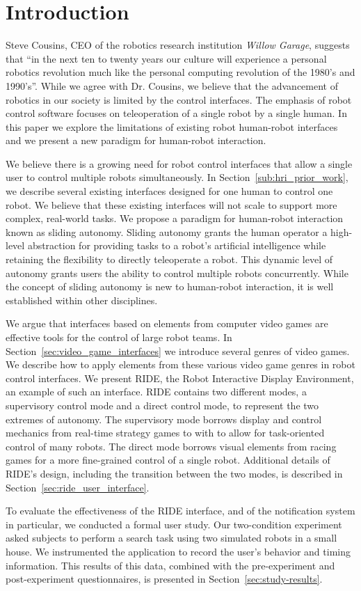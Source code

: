 \chapter{Introduction}
Steve Cousins, CEO of the robotics research institution \emph{Willow Garage}, suggests that ``in the next ten to twenty years our culture will experience a personal robotics revolution much like the personal computing revolution of the 1980's and 1990's''. \cite{Cousins} While we agree with Dr. Cousins, we believe that the advancement of robotics in our society is limited by the control interfaces. The emphasis of robot control software focuses on teleoperation of a single robot by a single human. In this paper we explore the limitations of existing robot human-robot interfaces and we present a new paradigm for human-robot interaction.

We believe there is a growing need for robot control interfaces that allow a single user to control multiple robots simultaneously. In Section~\ref{sub:hri_prior_work}, we describe several existing interfaces designed for one human to control one robot. We believe that these existing interfaces will not scale to support more complex, real-world tasks. We propose a paradigm for human-robot interaction known as sliding autonomy. Sliding autonomy grants the human operator a high-level abstraction for providing tasks to a robot's artificial intelligence while retaining the flexibility to directly teleoperate a robot. This dynamic level of autonomy grants users the ability to control multiple robots concurrently. While the concept of sliding autonomy is new to human-robot interaction, it is well established within other disciplines.

We argue that interfaces based on elements from computer video games are effective tools for the control of large robot teams. In Section~\ref{sec:video_game_interfaces} we introduce several genres of video games. We describe how to apply elements from these various video game genres in robot control interfaces. We present RIDE, the Robot Interactive Display Environment, an example of such an interface. RIDE contains two different modes, a supervisory control mode and a direct control mode, to represent the two extremes of autonomy. The supervisory mode borrows display and control mechanics from real-time strategy games to with to allow for task-oriented control of many robots. The direct mode borrows visual elements from racing games for a more fine-grained control of a single robot. Additional details of RIDE's design, including the transition between the two modes, is described in Section~\ref{sec:ride_user_interface}.

To evaluate the effectiveness of the RIDE interface, and of the notification system in particular, we conducted a formal user study. Our two-condition experiment asked subjects to perform a search task using two simulated robots in a small house. We instrumented the application to record the user's behavior and timing information. This results of this data, combined with the pre-experiment and post-experiment questionnaires, is presented in Section~\ref{sec:study-results}.